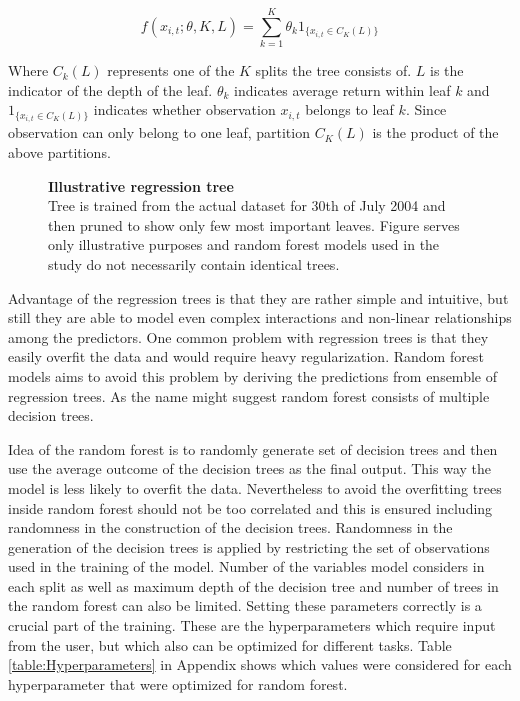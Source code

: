 \documentclass{article}
\begin{document}
\begin{equation}
f(x_{i, t}; \theta, K, L) = \sum_{k=1}^K \theta_k 1 _{\{x_{i, t} \in C_K(L)\}}
\end{equation}

Where $C_k(L)$ represents one of the $K$ splits the tree consists of. $L$ is the indicator of the depth of the leaf. $\theta_k$ indicates average return within leaf $k$ and $1 _{\{x_{i, t} \in C_K(L)\}}$ indicates whether observation $x_{i, t}$ belongs to leaf $k$. Since observation can only belong to one leaf, partition $C_K(L)$ is the product of the above partitions. \par

\begin{figure}[ht]
\centering
\caption[Illustrative regression tree]{\textbf{Illustrative regression tree}\\ Tree is trained from the actual dataset for 30th of July 2004 and then pruned to show only few most important leaves. Figure serves only illustrative purposes and random forest models used in the study do not necessarily contain identical trees. }

\label{plot:regre_tree}
\end{figure}

Advantage of the regression trees is that they are rather simple and intuitive, but still they are able to model even complex interactions and non-linear relationships among the predictors. One common problem with regression trees is that they easily overfit the data and would require heavy regularization. Random forest models aims to avoid this problem by deriving the predictions from ensemble of regression trees. As the name might suggest random forest consists of multiple decision trees. \par

Idea of the random forest is to randomly generate set of decision trees and then use the average outcome of the decision trees as the final output. This way the model is less likely to overfit the data. Nevertheless to avoid the overfitting trees inside random forest should not be too correlated and this is ensured including randomness in the construction of the decision trees. Randomness in the generation of the decision trees is applied by restricting the set of observations used in the training of the model. Number of the variables model considers in each split as well as maximum depth of the decision tree and number of trees in the random forest can also be limited. Setting these parameters correctly is a crucial part of the training. These are the hyperparameters which require input from the user, but which also can be optimized for different tasks. Table \ref{table:Hyperparameters} in Appendix shows which values were considered for each hyperparameter that were optimized for random forest. \par
\end{document}
